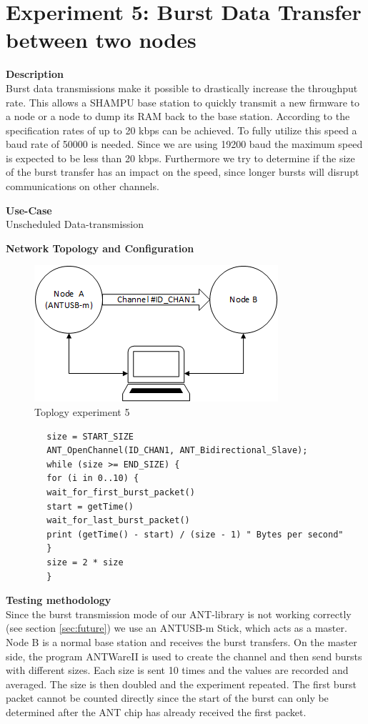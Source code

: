 \section{Experiment 5: Burst Data Transfer between two nodes}
\begin{description} 
	\item{\textbf{Description}} \hfill \\ Burst data transmissions make it possible to drastically increase the throughput rate. This allows a SHAMPU base station to quickly transmit a new firmware to a node or a node to dump its RAM back to the base station.	According to the  specification rates of up to 20 kbps can be achieved. To fully utilize this speed a baud rate of 50000 is needed. Since we are using 19200 baud the maximum speed is expected to be less than 20 kbps. Furthermore we try to determine if the size of the burst transfer has an impact on the speed, since longer bursts will disrupt communications on other channels.
	\item{\textbf{Use-Case}} \hfill \\ Unscheduled Data-transmission
	\item{\textbf{Network Topology and Configuration}} \hfill \\ 
	\begin{figure}[H]
		\centering
		\includegraphics[scale=1]{content/images/exp5_topo.png}
		\caption{Toplogy experiment 5}
	\end{figure}
	\begin{code}[H]
		\begin{verbatim}
		size = START_SIZE
		ANT_OpenChannel(ID_CHAN1, ANT_Bidirectional_Slave);		
		while (size >= END_SIZE) {
		for (i in 0..10) {
		wait_for_first_burst_packet()
		start = getTime()
		wait_for_last_burst_packet()
		print (getTime() - start) / (size - 1) " Bytes per second"
		}
		size = 2 * size
		}
		\end{verbatim}
		\caption{Burst data transfer (Slave)}\label{lst:sExp5}
	\end{code}
	\item{\textbf{Testing methodology}} \hfill \\ Since the burst transmission mode of our ANT-library is not working correctly (see section \ref{sec:future}) we use an ANTUSB-m Stick, which acts as a master. Node B is a normal base station and receives the burst transfers. On the master side, the program ANTWareII \cite{ANTwareII} is used to create the channel and then send bursts with different sizes. Each size is sent 10 times and the values are recorded and averaged. The size is then doubled and the experiment repeated. The first burst packet cannot be counted directly since the start of the burst can only be determined after the ANT chip has already received the first packet.

\end{description}
